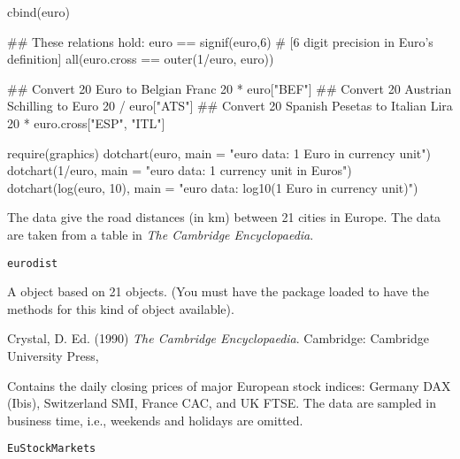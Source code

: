 %
\begin{Examples}
\begin{ExampleCode}
cbind(euro)

## These relations hold:
euro == signif(euro,6) # [6 digit precision in Euro's definition]
all(euro.cross == outer(1/euro, euro))

## Convert 20 Euro to Belgian Franc
20 * euro["BEF"]
## Convert 20 Austrian Schilling to Euro
20 / euro["ATS"]
## Convert 20 Spanish Pesetas to Italian Lira
20 * euro.cross["ESP", "ITL"]

require(graphics)
dotchart(euro,
         main = "euro data: 1 Euro in currency unit")
dotchart(1/euro,
         main = "euro data: 1 currency unit in Euros")
dotchart(log(euro, 10),
         main = "euro data: log10(1 Euro in currency unit)")
\end{ExampleCode}
\end{Examples}
%
\begin{Description}\relax
The data give the road distances (in km) between 21 cities in Europe.
The data are taken from a table in \emph{The Cambridge Encyclopaedia}.
\end{Description}
%
\begin{Usage}
\begin{verbatim}
eurodist
\end{verbatim}
\end{Usage}
%
\begin{Format}
A  object based on 21 objects.
(You must have the  package loaded to have the methods for this
kind of object available).
\end{Format}
%
\begin{Source}\relax
Crystal, D. Ed. (1990)
\emph{The Cambridge Encyclopaedia}.
Cambridge: Cambridge University Press,
\end{Source}
%
\begin{Description}\relax
Contains the daily closing prices of major European stock indices:
Germany DAX (Ibis), Switzerland SMI, France CAC, and UK FTSE.  The
data are sampled in business time, i.e., weekends and holidays are
omitted.
\end{Description}
%
\begin{Usage}
\begin{verbatim}
EuStockMarkets
\end{verbatim}
\end{Usage}
